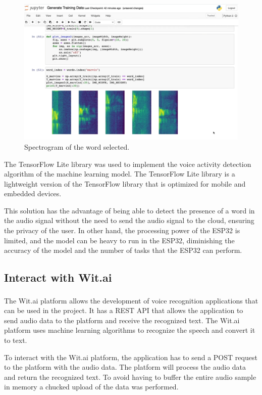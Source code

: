 \begin{figure}[H]
    \centering
    \includegraphics[width=1\textwidth]{Images/spec_marvin.png}
    \caption{Spectrogram of the word selected.}
    \label{fig:Spectre}
\end{figure}

The TensorFlow Lite library was used to implement the voice activity detection algorithm of the machine learning model. The TensorFlow Lite library is a lightweight version of the TensorFlow library that is optimized for mobile and embedded devices. 

This solution has the advantage of being able to detect the presence of a word in the audio signal without the need to send the audio signal to the cloud, ensuring the privacy of the user. In other hand, the processing power of the ESP32 is limited, and the model can be heavy to run in the ESP32, diminishing the accuracy of the model and the number of tasks that the ESP32 can perform.

\subsection{Interact with Wit.ai}

The Wit.ai \textsuperscript{\cite{Wit}} platform allows the development of voice recognition applications that can be used in the project. It has a REST API that allows the application to send audio data to the platform and receive the recognized text. The Wit.ai platform uses machine learning algorithms to recognize the speech and convert it to text. 

To interact with the Wit.ai platform, the application has to send a POST request to the platform with the audio data. The platform will process the audio data and return the recognized text. To avoid having to buffer the entire audio sample in memory a chucked upload of the data was performed.

